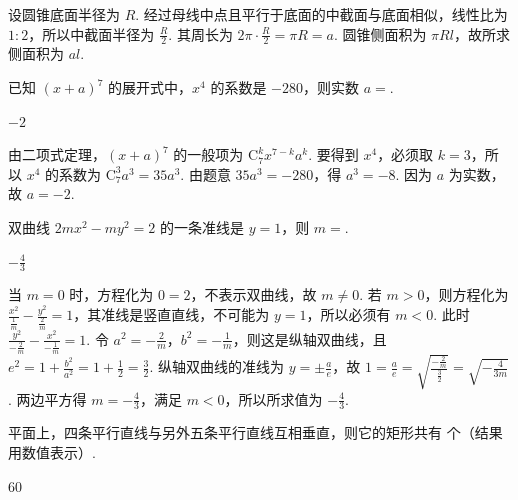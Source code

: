 \begin{solution}
设圆锥底面半径为 \(R\). 经过母线中点且平行于底面的中截面与底面相似，线性比为 \(1:2\)，所以中截面半径为 \(\frac R2\). 其周长为 \(2\pi\cdot\frac R2=\pi R=a\). 圆锥侧面积为 \(\pi Rl\)，故所求侧面积为 \(al\).
\end{solution}

\begin{problem}
已知 \((x+a)^7\) 的展开式中，\(x^4\) 的系数是 \(-280\)，则实数 \(a=\)\fillinblank{}.
\end{problem}

\begin{answer}
\(-2\)
\end{answer}

\begin{solution}
由二项式定理，\((x+a)^7\) 的一般项为 \(\mathrm C_7^k x^{7-k}a^k\). 要得到 \(x^4\)，必须取 \(k=3\)，所以 \(x^4\) 的系数为 \(\mathrm C_7^3a^3=35a^3\). 由题意 \(35a^3=-280\)，得 \(a^3=-8\). 因为 \(a\) 为实数，故 \(a=-2\).
\end{solution}

\begin{problem}
双曲线 \(2mx^2-my^2=2\) 的一条准线是 \(y=1\)，则 \(m=\)\fillinblank{}.
\end{problem}

\begin{answer}
\(-\frac43\)
\end{answer}

\begin{solution}
当 \(m=0\) 时，方程化为 \(0=2\)，不表示双曲线，故 \(m\ne0\). 若 \(m>0\)，则方程化为 \(\frac{x^2}{\frac{1}{m}}-\frac{y^2}{\frac{2}{m}}=1\)，其准线是竖直直线，不可能为 \(y=1\)，所以必须有 \(m<0\). 此时
\(\frac{y^2}{-\frac{2}{m}}-\frac{x^2}{-\frac{1}{m}}=1\). 令 \(a^2=-\frac2m\)，\(b^2=-\frac1m\)，则这是纵轴双曲线，且
\(e^2=1+\frac{b^2}{a^2}=1+\frac12=\frac32\). 纵轴双曲线的准线为 \(y=\pm\frac ae\)，故
\(1=\frac ae=\sqrt{\frac{-\frac{2}{m}}{\frac{3}{2}}}=\sqrt{-\frac4{3m}}\). 两边平方得 \(m=-\frac43\)，满足 \(m<0\)，所以所求值为 \(-\frac43\).
\end{solution}

\begin{problem}
平面上，四条平行直线与另外五条平行直线互相垂直，则它的矩形共有\fillinblank{} 个（结果用数值表示）.
\end{problem}

\begin{answer}
\(60\)
\end{answer}

